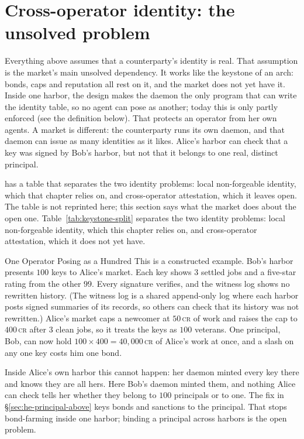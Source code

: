 \documentclass[11pt,a4paper]{article}
\theoremstyle{definition}
\theoremstyle{definition}
\theoremstyle{remark}
\begin{document}
\pdexercisepointerone{\ref{ex:he-deontic-conflict-checker}}{\pageref{ex:he-deontic-conflict-checker}}


\section{Cross-operator identity: the unsolved problem}\label{sec:keystone}

Everything above assumes that a counterparty's identity is real. That
assumption is the market's main unsolved dependency. It works like the
keystone of an arch: bonds, caps and reputation all rest on it, and the market
does not yet have it. Inside one harbor, the
design makes the daemon the only program that can write the identity table, so
no agent can pose as another; today this is only partly enforced (see the
definition below). That protects an operator from her own agents. A market is
different: the counterparty runs its own daemon, and that daemon can issue as
many identities as it likes. Alice's harbor can check that a key was signed by
Bob's harbor, but not that it belongs to one real, distinct principal.

\ifpdbook
{} has a table that separates the two
identity problems: local non-forgeable identity, which that chapter relies on,
and cross-operator attestation, which it leaves open. The table is not
reprinted here; this section says what the market does about the open one.
\else
Table~\ref{tab:keystone-split} separates the two identity problems: local
non-forgeable identity, which this chapter relies on, and cross-operator
attestation, which it does not yet have.


\fi

\begin{pdexample}{One Operator Posing as a Hundred}
\setlength{\parskip}{4pt plus 1pt}
This is a constructed example. Bob's harbor presents $100$ keys to Alice's
market. Each key shows $3$ settled jobs and a five-star rating from the other
$99$. Every signature verifies, and the witness log shows no rewritten
history. (The witness log is a shared append-only log where each harbor posts
signed summaries of its records, so others can check that its history was not
rewritten.) Alice's market caps a newcomer at $50$\,\textsc{cr} of work and raises
the cap to $400$\,\textsc{cr} after $3$ clean jobs, so it treats the keys as
$100$ veterans. One principal, Bob, can now hold
$100\times400=40{,}000$\,\textsc{cr} of Alice's work at once, and a slash on any
one key costs him one bond.

Inside Alice's own harbor this cannot happen: her daemon minted every key there
and knows they are all hers. Here Bob's daemon minted them, and nothing Alice
can check tells her whether they belong to $100$ principals or to one. The fix
in \S\ref{sec:he-principal-above} keys bonds and sanctions to the principal. That
stops bond-farming inside one harbor; binding a principal across harbors is
the open problem.
\end{pdexample}
\end{document}
